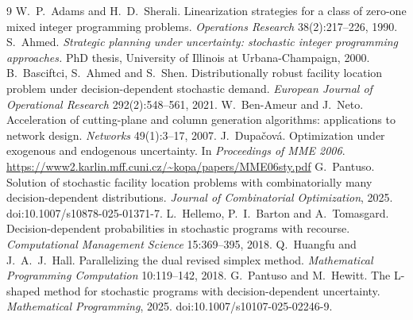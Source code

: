 \documentclass[11pt]{article}
\begin{document}
\begin{thebibliography}{9}
 W.~P.~Adams and H.~D.~Sherali. Linearization strategies for a class of zero-one mixed
integer programming problems. \emph{Operations Research} 38(2):217--226, 1990.
 S.~Ahmed. \emph{Strategic planning under uncertainty: stochastic integer programming approaches.}
PhD thesis, University of Illinois at Urbana-Champaign, 2000.
 B.~Basciftci, S.~Ahmed and S.~Shen. Distributionally robust facility location problem under
decision-dependent stochastic demand. \emph{European Journal of Operational Research} 292(2):548--561, 2021.
 W.~Ben-Ameur and J.~Neto. Acceleration of cutting-plane and column generation algorithms:
applications to network design. \emph{Networks} 49(1):3--17, 2007.
 J.~Dupa\v{c}ov\'a. Optimization under exogenous and endogenous uncertainty. In \emph{Proceedings
of MME 2006}. \url{https://www2.karlin.mff.cuni.cz/~kopa/papers/MME06sty.pdf}
 G.~Pantuso. Solution of stochastic facility location problems with combinatorially many
decision-dependent distributions. \emph{Journal of Combinatorial Optimization}, 2025. doi:10.1007/s10878-025-01371-7.
 L.~Hellemo, P.~I.~Barton and A.~Tomasgard. Decision-dependent probabilities in stochastic
programs with recourse. \emph{Computational Management Science} 15:369--395, 2018.
 Q.~Huangfu and J.~A.~J.~Hall. Parallelizing the dual revised simplex method. \emph{Mathematical
Programming Computation} 10:119--142, 2018.
 G.~Pantuso and M.~Hewitt. The L-shaped method for stochastic programs with decision-dependent
uncertainty. \emph{Mathematical Programming}, 2025. doi:10.1007/s10107-025-02246-9.
\end{thebibliography}
\end{document}
